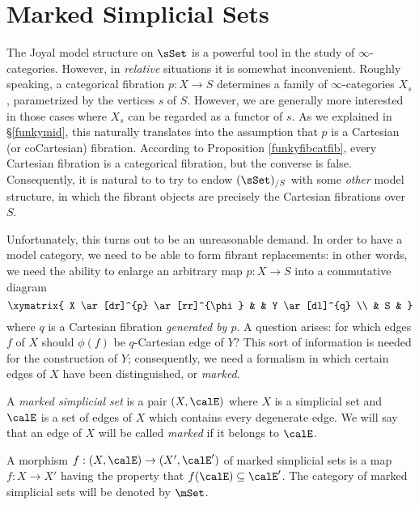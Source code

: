 \section{Marked Simplicial Sets}\label{twuf}

The Joyal model structure on $\sSet$ is a powerful tool in the study of  $\infty$-categories. However, in {\em relative} situations it is somewhat inconvenient. Roughly speaking, a categorical fibration $p: X \rightarrow S$ determines a family of $\infty$-categories $X_{s}$, parametrized by the vertices $s$ of $S$. However, we are generally more interested in those cases where $X_{s}$ can be regarded as a functor of $s$. As we explained in \S \ref{funkymid}, this naturally translates into the assumption that $p$ is a Cartesian (or coCartesian) fibration. According to Proposition \ref{funkyfibcatfib}, every Cartesian fibration is a categorical fibration, but the converse is false. Consequently, it is natural to to try to endow $(\sSet)_{/S}$ with some {\em other} model structure, in which the fibrant objects are precisely the Cartesian fibrations over $S$. 

Unfortunately, this turns out to be an unreasonable demand. In order to have a model category, we need to be able to form fibrant replacements: in other words, we need the ability to enlarge an arbitrary map $p: X \rightarrow S$ into a commutative diagram
$$ \xymatrix{ X \ar[dr]^{p} \ar[rr]^{\phi} & & Y \ar[dl]^{q} \\
& S & }$$
where $q$ is a Cartesian fibration {\em generated by $p$}. A question arises: for which edges $f$ of $X$ should $\phi(f)$ be $q$-Cartesian edge of $Y$? This sort of information is needed for the construction of $Y$; consequently, we need a formalism in which certain edges of $X$ have been distinguished, or {\it marked}.

\setcounter{theorem}{0}

\begin{definition}
A  {\it marked simplicial set} is a pair $(X,\calE)$ where $X$ is a simplicial set and
$\calE$ is a set of edges of $X$ which contains every degenerate edge. We will say that an edge of $X$ will be called {\it marked} if it belongs to $\calE$.

A morphism $f: (X,\calE) \rightarrow (X', \calE')$ of marked simplicial sets is a map $f: X \rightarrow X'$ having the property that $f(\calE) \subseteq \calE'$. The category of marked simplicial sets will be denoted by $\mSet$.
\end{definition}

